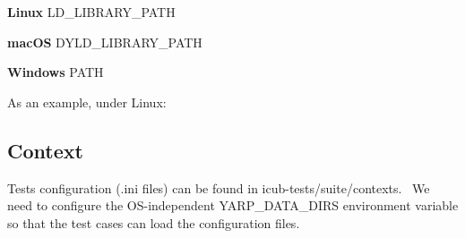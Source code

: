 \begin{DoxyItemize}
\item {\bfseries Linux} {\ttfamily L\+D\+\_\+\+L\+I\+B\+R\+A\+R\+Y\+\_\+\+P\+A\+TH} \item {\bfseries mac\+OS} {\ttfamily D\+Y\+L\+D\+\_\+\+L\+I\+B\+R\+A\+R\+Y\+\_\+\+P\+A\+TH} \item {\bfseries Windows} {\ttfamily P\+A\+TH}\end{DoxyItemize}
As an example, under Linux\+: 
\hypertarget{installation_context}{}\subsection{Context}\label{installation_context}
Tests configuration (.ini files) can be found in {\ttfamily icub-\/tests/suite/contexts}.~\newline
We need to configure the O\+S-\/independent {\ttfamily Y\+A\+R\+P\+\_\+\+D\+A\+T\+A\+\_\+\+D\+I\+RS} environment variable so that the test cases can load the configuration files.


 